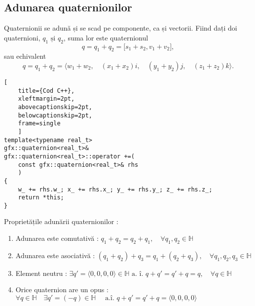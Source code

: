 \subsection{Adunarea quaternionilor}
\label{ch1:quaternions:addition}
Quaternionii se adună și se scad pe componente, ca și vectorii.
Fiind dați doi quaternioni, $q_1 \text{ și } q_2$, suma lor este quaternionul
\begin{equation}
q = q_1 + q_2 = \lbrack s_1 + s_2, v_1 + v_2 \rbrack,
\end{equation} sau echivalent
\begin{equation}
q = q_1 + q_2 = \langle w_1 + w_2, \quad (x_1 + x_2)i, \quad (y_1 + y_2)j, 
\quad (z_1 + z_2)k \rangle.
\end{equation}

\begin{lstlisting}[
    title={Cod C++}, 
    xleftmargin=2pt,
    abovecaptionskip=2pt,
    belowcaptionskip=2pt,
    frame=single
    ]
template<typename real_t>
gfx::quaternion<real_t>&
gfx::quaternion<real_t>::operator +=(
    const gfx::quaternion<real_t>& rhs
    )
{
    w_ += rhs.w_; x_ += rhs.x_; y_ += rhs.y_; z_ += rhs.z_;
    return *this;
}

\end{lstlisting}

\noindent
Proprietățile adunării quaternionilor :
\begin{enumerate}
    \item Adunarea este comutativă : 
    $q_1 + q_2 = q_2 + q_1, \quad \forall q_1, q_2 \in \mathbb{H}$
    \item Adunarea este asociativă :
    $(q_1 + q_2) + q_3 = q_1 + (q_2 + q_3), \quad \forall q_1, q_2, q_3
    \in \mathbb{H}$
    \item Element neutru : $\exists q' = \langle 0, 0, 0, 0 \rangle \in 
    \mathbb{H} \text{ a. î. } q + q' = q' + q = q, \quad \forall q \in
    \mathbb{H}$ 
    \item Orice quaternion are un opus : $\forall q \in \mathbb{H} \quad
    \exists q' = (-q) \in \mathbb{H} \quad \text{ a.î. } q + q' = q' + q = 
    \langle 0, 0, 0, 0 \rangle$
\end{enumerate}

